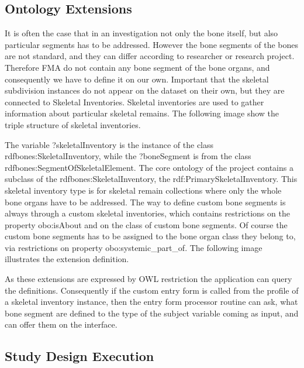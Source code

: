 \subsection{Ontology Extensions}

It is often the case that in an investigation not only the bone itself, but also particular segments has to be addressed. However the bone segments of the bones are not standard, and they can differ according to researcher or research project. Therefore FMA do not contain any bone segment of the bone organs, and consequently we have to define it on our own. 
Important that the skeletal subdivision instances do not appear on the dataset on their own, but they are connected to Skeletal Inventories. Skeletal inventories are used to gather information about particular skeletal remains.  The following image show the triple structure of skeletal inventories.


The variable ?skeletalInventory is the instance of the class rdfbones:SkeletalInventory, while the ?boneSegment is from the class rdfbones:SegmentOfSkeletalElement. The core ontology of the project contains a subclass of the rdfbones:SkeletalInventory, the rdf:PrimarySkeletalInventory. This skeletal inventory type is for skeletal remain collections where only the whole bone organs have to be addressed.  The way to define custom bone segments is always through a custom skeletal inventories, which contains restrictions on the property obo:isAbout and on the class of custom bone segments. Of course the custom bone segments has to be assigned to the bone organ class they belong to, via restrictions on property obo:systemic\_part\_of. The following image illustrates the extension definition.


As these extensions are expressed by OWL restriction the application can query the definitions. Consequently if the custom entry form is called from the profile of a skeletal inventory instance, then the entry form processor routine can ask, what bone segment are defined to the type of the subject variable coming as input, and can offer them on the interface.

\subsection{Study Design Execution}

